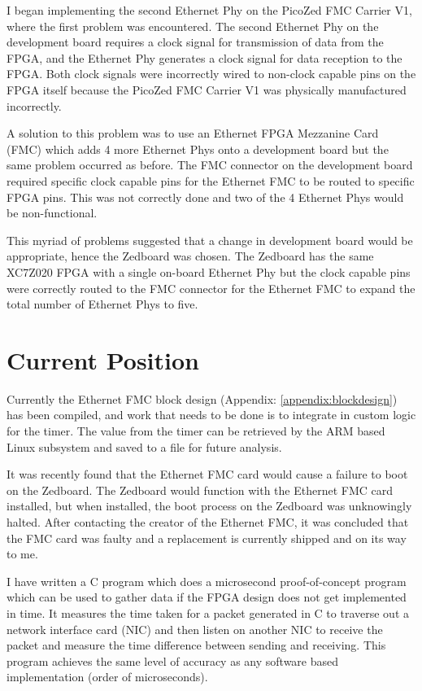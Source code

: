 \par I began implementing the second Ethernet Phy on the PicoZed FMC Carrier V1, where the first
problem was encountered. The second Ethernet Phy on the development board requires a clock
signal for transmission of data from the FPGA, and the Ethernet Phy generates a clock signal for data
reception to the FPGA. Both clock signals were incorrectly wired to non-clock capable pins on the
FPGA itself because the PicoZed FMC Carrier V1 was physically manufactured incorrectly.

\par A solution to this problem was to use an Ethernet FPGA Mezzanine Card (FMC) which adds 4 more
Ethernet Phys onto a development board but the same problem occurred as before. The FMC
connector on the development board required specific clock capable pins for the Ethernet FMC to be
routed to specific FPGA pins. This was not correctly done and two of the 4 Ethernet Phys would be
non-functional.

\par This myriad of problems suggested that a change in development board would be appropriate,
hence the Zedboard was chosen. The Zedboard has the same XC7Z020 FPGA with a single on-board
Ethernet Phy but the clock capable pins were correctly routed to the FMC connector for the Ethernet
FMC to expand the total number of Ethernet Phys to five.

\section{Current Position}

\par Currently the Ethernet FMC block design (Appendix: \ref{appendix:blockdesign}) has been compiled, and work that needs to be done is to integrate in custom logic for the timer. The value from the timer can be retrieved by the ARM based Linux subsystem and saved to a file for future analysis. 

\par It was recently found that the Ethernet FMC card would cause a failure to boot on the Zedboard. The
Zedboard would function with the Ethernet FMC card installed, but when installed, the boot process
on the Zedboard was unknowingly halted. After contacting the creator of the Ethernet FMC, it was
concluded that the FMC card was faulty and a replacement is currently shipped and on its way to me.

\par I have written a C program which does a microsecond proof-of-concept program which can be used
to gather data if the FPGA design does not get implemented in time. It measures the time taken for a
packet generated in C to traverse out a network interface card (NIC) and then listen on another NIC
to receive the packet and measure the time difference between sending and receiving. This program
achieves the same level of accuracy as any software based implementation (order of microseconds).
